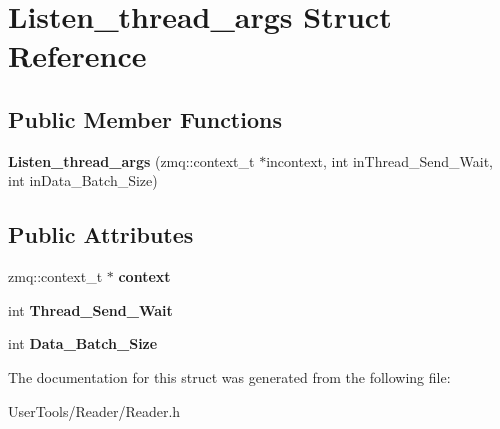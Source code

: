 \hypertarget{structListen__thread__args}{\section{Listen\-\_\-thread\-\_\-args Struct Reference}
\label{structListen__thread__args}
}
\subsection*{Public Member Functions}
\begin{DoxyCompactItemize}
\item 
\hypertarget{structListen__thread__args_abf805ea021928317133fd2763057c41b}{{\bfseries Listen\-\_\-thread\-\_\-args} (zmq\-::context\-\_\-t $\ast$incontext, int in\-Thread\-\_\-\-Send\-\_\-\-Wait, int in\-Data\-\_\-\-Batch\-\_\-\-Size)}\label{structListen__thread__args_abf805ea021928317133fd2763057c41b}

\end{DoxyCompactItemize}
\subsection*{Public Attributes}
\begin{DoxyCompactItemize}
\item 
\hypertarget{structListen__thread__args_a8a54e21695d6adc440c2d3aff4b4b100}{zmq\-::context\-\_\-t $\ast$ {\bfseries context}}\label{structListen__thread__args_a8a54e21695d6adc440c2d3aff4b4b100}

\item 
\hypertarget{structListen__thread__args_ac9e666528fb85b233238a085b90c8ade}{int {\bfseries Thread\-\_\-\-Send\-\_\-\-Wait}}\label{structListen__thread__args_ac9e666528fb85b233238a085b90c8ade}

\item 
\hypertarget{structListen__thread__args_aebbe1f97fe2cd271e58170b12012e81d}{int {\bfseries Data\-\_\-\-Batch\-\_\-\-Size}}\label{structListen__thread__args_aebbe1f97fe2cd271e58170b12012e81d}

\end{DoxyCompactItemize}


The documentation for this struct was generated from the following file\-:\begin{DoxyCompactItemize}
\item 
User\-Tools/\-Reader/Reader.\-h\end{DoxyCompactItemize}
